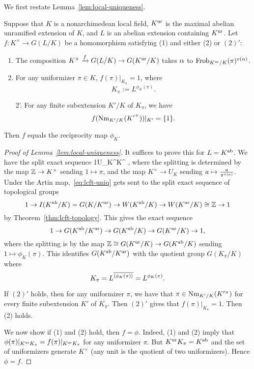 We first restate Lemma~\ref{lem:local-uniqueness}.
%
\begin{lem*}
Suppose that $K$ is a nonarchimedean local field, $K^{\text{ur}}$ is the maximal abelian unramified extension of $K$, and $L$ is an abelian extension containing $K^{\text{ur}}$. Let $f:K^{\times}\to G(L/K)$ be a homomorphism satisfying (1) and either (2) or $(2)'$:
\begin{enumerate}
\item
The composition $K^{\times}\xrightarrow{f} G(L/K) \to G(K^{\text{ur}}/K)$ takes $\alpha$ to $\operatorname{Frob}_{K^{\text{ur}}/K}(\pi)^{v(\alpha)}$.
\item
For any uniformizer $\pi\in K$, $f(\pi)|_{K_{\pi}}=1$, where 
\[
K_{\pi}:=L^{\phi_K(\pi)}.
\]
\item[2'.]
For any finite subextension $K'/K$ of $K_{\pi}$, we have
\[
f(\operatorname{Nm}_{K'/K}({K'}^{\times}))|_{K'}=\{1\}.
\]
\end{enumerate}
Then $f$ equals the reciprocity map $\phi_K$.
\end{lem*}
%
\begin{proof}[Proof of Lemma~\ref{lem:local-uniqueness}]
It suffices to prove this for $L=K^{\text{ab}}$. We have the split exact sequence
1\to U_K^{\times}\to K^{\times} \Z{},
\eeq
where the splitting is determined by the map $\mathbb{Z}\to K^{\times}$ sending $1\mapsto \pi$, and the map $K^{\times}\to U_K$ sending $a\mapsto \frac{a}{\pi^{v(a)}}$.
Under the Artin map,~\eqref{eq:lcft-uniq} gets sent to the split exact sequence of topological groups
\[
1\to I(K^{\text{ab}}/K)=G(K/K^{\text{ur}})\to W(K^{\text{ab}}/K)\to W(K^{\text{ur}}/K)\cong \mathbb{Z}\to 1
\]
by Theorem~\ref{thm:lcft-topology}.
This gives the exact sequence
\[
1\to G(K^{\text{ab}}/K^{\text{ur}})\to G(K^{\text{ab}}/K)\to G(K^{\text{ur}}/K)\to 1,
\]
where the splitting is by the map $\mathbb{Z}\cong G(K^{\text{ur}}/K)\to G(K^{\text{ab}}/K)$ sending $1\mapsto \phi_K(\pi)$. This identifies $G(K^{\text{ab}}/K^{\text{ur}})$ with the quotient group $G(K_{\pi}/K)$ where 
\[K_{\pi}=L^{\overline{\left\langle {\phi_K(\pi)}\right\rangle}}=L^{\phi_K(\pi)}.\]

If $(2)'$ holds, then for any uniformizer $\pi$, we have that %
$\pi\in \operatorname{Nm}_{K'/K}(K'^{\times})$ for every finite subextension $K'$ of $K_{\pi}$. Then $(2)'$ gives that $f(\pi)|_{K_{\pi}}=1$. Then (2) holds.

We now show if (1) and (2) hold, then $f=\phi$. Indeed, (1) and (2) imply that $\phi(\pi)|_{K^{\text{ur}} K_{\pi}}=f(\pi)|_{K^{\text{ur}} K_{\pi}}$ for any uniformizer $\pi$. But $K^{\text{ur}} K_{\pi}=K^{\text{ab}}$ and the set of uniformizers generate $K^{\times}$ (any unit is the quotient of two uniformizers). Hence $\phi=f$.
\end{proof}
